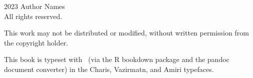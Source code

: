 \thispagestyle{empty}
\begingroup
\footnotesize
\parindent 0pt
\parskip \baselineskip
\textcopyright{} 2023 Author Names \\
All rights reserved.

    This work may not be distributed or modified, without written permission from the copyright holder.

\texttt{\gitTag}

This book is typeset with \XeLaTeX\ (via the R bookdown package and the pandoc document converter)
in the Charis, Vazirmatn, and Amiri typefaces.


\vfill




\endgroup
\clearpage


